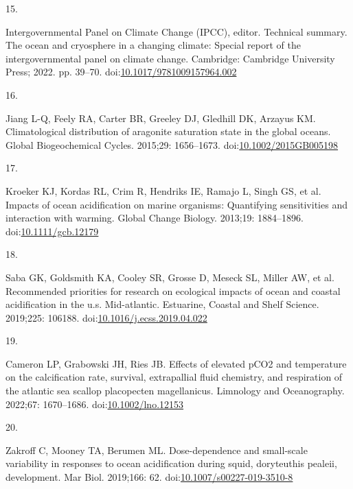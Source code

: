 \documentclass[
  10pt,
]{article}
\newlength{\cslhangindent}
\newlength{\csllabelwidth}
\newlength{\cslentryspacingunit} %
\newenvironment{CSLReferences}[2] %
 {%
  \setlength{\parindent}{0pt}
  \ifodd #1
  \let\oldpar\par
  \def\par{\hangindent=\cslhangindent\oldpar}
  \fi
  \setlength{\parskip}{#2\cslentryspacingunit}
 }%
 {}
\newcommand{\CSLLeftMargin}[1]{\parbox[t]{\csllabelwidth}{#1}}
\newcommand{\CSLRightInline}[1]{\parbox[t]{\linewidth - \csllabelwidth}{#1}\break}
\begin{document}
\begin{CSLReferences}{0}{0}
\leavevmode{}%
\CSLLeftMargin{15. }%
\CSLRightInline{Intergovernmental Panel on Climate Change (IPCC), editor. Technical summary. The ocean and cryosphere in a changing climate: Special report of the intergovernmental panel on climate change. Cambridge: Cambridge University Press; 2022. pp. 39--70. doi:\href{https://doi.org/10.1017/9781009157964.002}{10.1017/9781009157964.002}}

\leavevmode{}%
\CSLLeftMargin{16. }%
\CSLRightInline{Jiang L-Q, Feely RA, Carter BR, Greeley DJ, Gledhill DK, Arzayus KM. Climatological distribution of aragonite saturation state in the global oceans. Global Biogeochemical Cycles. 2015;29: 1656--1673. doi:\href{https://doi.org/10.1002/2015GB005198}{10.1002/2015GB005198}}

\leavevmode{}%
\CSLLeftMargin{17. }%
\CSLRightInline{Kroeker KJ, Kordas RL, Crim R, Hendriks IE, Ramajo L, Singh GS, et al. Impacts of ocean acidification on marine organisms: Quantifying sensitivities and interaction with warming. Global Change Biology. 2013;19: 1884--1896. doi:\href{https://doi.org/10.1111/gcb.12179}{10.1111/gcb.12179}}

\leavevmode{}%
\CSLLeftMargin{18. }%
\CSLRightInline{Saba GK, Goldsmith KA, Cooley SR, Grosse D, Meseck SL, Miller AW, et al. Recommended priorities for research on ecological impacts of ocean and coastal acidification in the u.s. Mid-atlantic. Estuarine, Coastal and Shelf Science. 2019;225: 106188. doi:\href{https://doi.org/10.1016/j.ecss.2019.04.022}{10.1016/j.ecss.2019.04.022}}

\leavevmode{}%
\CSLLeftMargin{19. }%
\CSLRightInline{Cameron LP, Grabowski JH, Ries JB. Effects of elevated {pCO}2 and temperature on the calcification rate, survival, extrapallial fluid chemistry, and respiration of the atlantic sea scallop placopecten magellanicus. Limnology and Oceanography. 2022;67: 1670--1686. doi:\href{https://doi.org/10.1002/lno.12153}{10.1002/lno.12153}}

\leavevmode{}%
\CSLLeftMargin{20. }%
\CSLRightInline{Zakroff C, Mooney TA, Berumen ML. Dose-dependence and small-scale variability in responses to ocean acidification during squid, doryteuthis pealeii, development. Mar Biol. 2019;166: 62. doi:\href{https://doi.org/10.1007/s00227-019-3510-8}{10.1007/s00227-019-3510-8}}


\end{CSLReferences}
\end{document}
